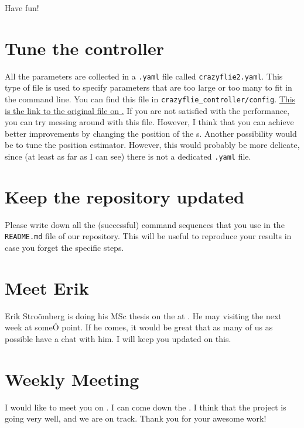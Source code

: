 


Have fun!










\section*{Tune the \PID{} controller}

All the \PID{} parameters are collected in a \lstinline|.yaml| file called \lstinline|crazyflie2.yaml|.
This type of file is used to specify \ROS{} parameters that are too large or too many to fit in the command line.
You can find this file in \lstinline|crazyflie_controller/config|. \href{https://github.com/whoenig/crazyflie_ros/tree/master/crazyflie_controller/config}{This is the link to the original file on \Github{}.}
If you are not satisfied with the performance, you can try messing around with this file.
However, I think that you can achieve better improvements by changing the position of the \LPN{}s.
Another possibility would be to tune the position estimator.
However, this would probably be more delicate, since (at least as far as I can see) there is not a dedicated \lstinline|.yaml| file.










\section*{Keep the \Github{} repository updated}

Please write down all the (successful) command sequences that you use in the \lstinline|README.md| file of our repository.
This will be useful to reproduce your results in case you forget the specific steps.






\section*{Meet Erik}

Erik Stro\"omberg is doing his MSc thesis on the \CF{} at \Ericsson{}.
He may visiting the \SML{} next week at someÓ point.
If he comes, it would be great that as many of us as possible have a chat with him.
I will keep you updated on this.






\section*{Weekly Meeting}

I would like to meet you on .
I can come down the \SML{}.
I think that the project is going very well, and we are on track.
Thank you for your awesome work!
